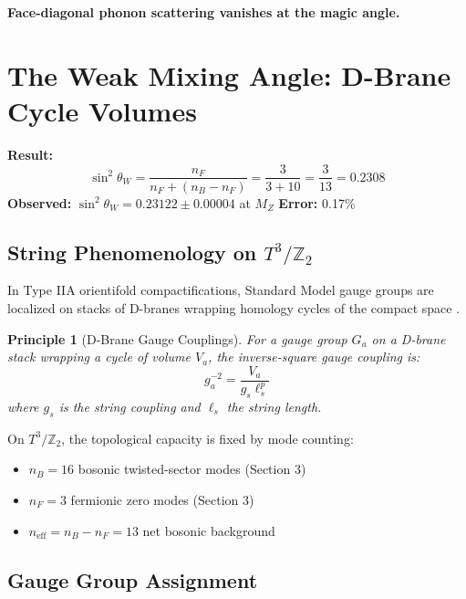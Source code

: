 \documentclass[12pt,a4paper]{article}
\newtheorem{principle}[theorem]{Principle}
\newcommand{\Ztwo}{\mathbb{Z}_2}
\newcommand{\Tthree}{T^3}
\newcommand{\sinW}{\sin^2\theta_W}
\newcommand{\nB}{n_B}
\newcommand{\nF}{n_F}
\begin{document}
\textbf{Face-diagonal phonon scattering vanishes at the magic angle.}

\section{The Weak Mixing Angle: D-Brane Cycle Volumes}
\label{sec:weinberg}

\begin{derivedbox}
\textbf{Result:}
\begin{equation}
\sinW = \frac{\nF}{\nF + (\nB - \nF)} = \frac{3}{3 + 10} = \frac{3}{13} = 0.2308
\end{equation}
\textbf{Observed:} $\sinW = 0.23122 \pm 0.00004$ at $M_Z$ \quad \textbf{Error:} 0.17\%
\end{derivedbox}

\subsection{String Phenomenology on $\Tthree/\Ztwo$}

In Type IIA orientifold compactifications, Standard Model gauge groups are localized on stacks of D-branes wrapping homology cycles of the compact space \cite{Ibanez}.

\begin{principle}[D-Brane Gauge Couplings]
For a gauge group $G_a$ on a D-brane stack wrapping a cycle of volume $V_a$, the inverse-square gauge coupling is:
\begin{equation}
g_a^{-2} = \frac{V_a}{g_s \ell_s^p}
\end{equation}
where $g_s$ is the string coupling and $\ell_s$ the string length.
\end{principle}

On $\Tthree/\Ztwo$, the topological capacity is fixed by mode counting:
\begin{itemize}
    \item $\nB = 16$ bosonic twisted-sector modes (Section 3)
    \item $\nF = 3$ fermionic zero modes (Section 3)
    \item $n_{\text{eff}} = \nB - \nF = 13$ net bosonic background
\end{itemize}

\subsection{Gauge Group Assignment}
\end{document}

